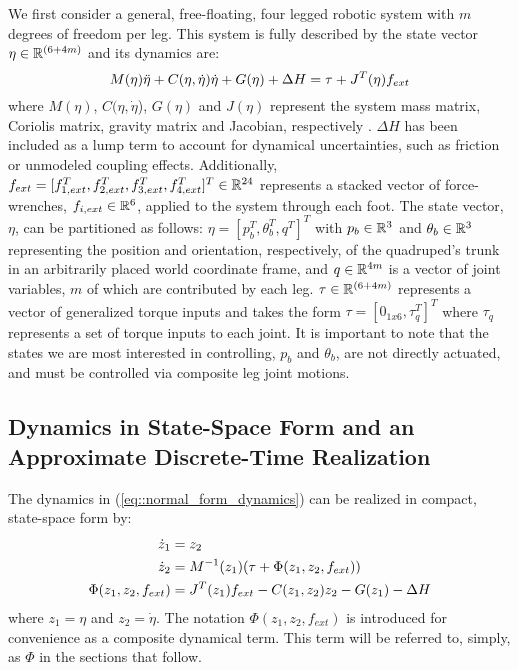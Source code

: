 
We first consider a general, free-floating, four legged robotic system with $m$ degrees of freedom per leg. This system is fully described by the state vector $\eta \in \mathbb{R}^{(6+4m)}$ and its dynamics are:
	\begin{equation}
		\vspace{-1.0mm}
		M(\eta)\ddot{\eta} + C(\eta,\dot{\eta})\dot{\eta} + G(\eta) + \Delta{H} = \tau + J^T(\eta) f_{ext} %
		\label{eq::normal_form_dynamics}
	\end{equation}
where $M(\eta)$, $C(\eta,\dot{\eta}$), $G(\eta)$ and $J(\eta)$ represent the system mass matrix, Coriolis matrix, gravity matrix and Jacobian, respectively \cite{Wieber2006}. $\Delta{H}$ has been included as a lump term to account for dynamical uncertainties, such as friction or unmodeled coupling effects. Additionally, $f_{ext} = [ f_{1,ext}^{T},f_{2,ext}^{T},f_{3,ext}^{T},f_{4,ext}^{T}]^{T} \in \mathbb{R}^{24}$ represents a stacked vector of force-wrenches, $f_{i,ext} \in \mathbb{R}^{6}$, applied to the system through each \Ith foot. The state vector, $\eta$, can be partitioned as follows: $\eta = [ p_{b}^{T}, \theta_{b}^{T}, q^{T} ]^{T}$ with $p_{b} \in \mathbb{R}^{3}$ and $\theta_{b} \in \mathbb{R}^{3}$ representing the position and orientation, respectively, of the quadruped's trunk in an arbitrarily placed world coordinate frame, and $q \in \mathbb{R}^{4 m}$ is a vector of joint variables, $m$ of which are contributed by each leg. $\tau \in \mathbb{R}^{(6+4m)}$ represents a vector of generalized torque inputs and takes the form $\tau = [ 0_{1x6}, \tau_{q}^{T} ]^{T}$ where $\tau_{q}$ represents a set of torque inputs to each joint. It is important to note that the states we are most interested in controlling, $p_{b}$ and $\theta_{b}$, are not directly actuated, and must be controlled via composite leg joint motions.


\subsection{Dynamics in State-Space Form and an Approximate Discrete-Time Realization}
%
%
The dynamics in (\ref{eq::normal_form_dynamics}) can be realized in compact, state-space form by:
	\begin{equation}
		\vspace{-1.0mm}
		\begin{split}
		\dot{z}_{1} 				&= z_{2} \\
		\dot{z}_{2} 				&= M^{-1}(z_{1})(\tau + \Phi(z_{1},z_{2},f_{ext})) \\
		\Phi(z_{1},z_{2},f_{ext}) 	&= J^T(z_{1}) f_{ext} - C(z_{1},z_{2})z_{2} - G(z_{1}) - \Delta{H}
		\end{split}
		\label{eq::state_space_dynamics}
	\end{equation}
where $z_{1}=\eta$ and $z_{2}=\dot{\eta}$. The notation $\Phi(z_{1},z_{2},f_{ext})$ is introduced for convenience as a composite dynamical term. This term will be referred to, simply, as $\Phi$ in the sections that follow.

